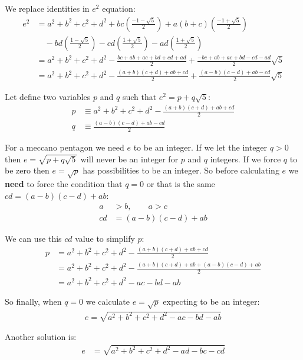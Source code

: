 \documentclass[11pt]{article}
\begin{document}
We replace identities in $e^2$ equation:
\begin{align}
e^2 &= a^2+b^2+c^2+d^2 + bc\left(\frac{-1-\sqrt{5}}{2}\right) + a(b+c)\left(\frac{-1+\sqrt{5}}{2}\right) \nonumber\\
&\quad - bd\left(\frac{1-\sqrt{5}}{2}\right) - cd\left(\frac{1+\sqrt{5}}{2}\right) - ad\left(\frac{1+\sqrt{5}}{2}\right) \nonumber\\
 &= a^2+b^2+c^2+d^2 - \frac{bc+ab+ac+bd+cd+ad}{2} + \frac{-bc+ab+ac+bd-cd-ad}{2}\sqrt{5} \nonumber\\
 &= a^2+b^2+c^2+d^2 - \frac{(a+b)(c+d)+ab+cd}{2} + \frac{(a-b)(c-d)+ab-cd}{2}\sqrt{5}
\end{align}

Let define two variables $p$ and $q$ such that $e^2 = p + q\sqrt{5}$:
\begin{align*}
p &\equiv a^2+b^2+c^2 + d^2 - \frac{(a+b)(c+d)+ab+cd}{2}\\
q &\equiv \frac{(a-b)(c-d) + ab - cd}{2}
\end{align*}

For a meccano pentagon we need $e$ to be an integer. If we let the integer $q > 0$ then $e = \sqrt{p + q\sqrt{5}}$ will never be an integer for $p$ and $q$ integers. If we force $q$ to be zero then $e = \sqrt{p}$ has possibilities to be an integer.
So before calculating $e$ we \textbf{need} to force the condition that $q = 0$ or that is the same $cd = (a-b)(c-d)+ab$:
\begin{align}
a  & > b, \qquad a > c\\
cd &= (a-b)(c-d)+ab
\end{align}

We can use this $cd$ value to simplify $p$:
\begin{align*}
p &= a^2+b^2+c^2+d^2 - \frac{(a+b)(c+d)+ab+cd}{2}\\
  &= a^2+b^2+c^2+d^2 - \frac{(a+b)(c+d)+ab+(a-b)(c-d)+ab}{2}\\
  &= a^2+b^2+c^2+d^2 -ac -bd -ab
\end{align*}

So finally, when $q=0$ we calculate $e = \sqrt{p}$ expecting to be an integer:
\begin{align}
\boxed{ e = \sqrt{a^2 + b^2 + c^2 + d^2 -ac -bd - ab} }
\end{align}

Another solution is:
\begin{align}
e &= \sqrt{a^2 + b^2 + c^2 + d^2 -ad -bc - cd}
\end{align}
\end{document}
